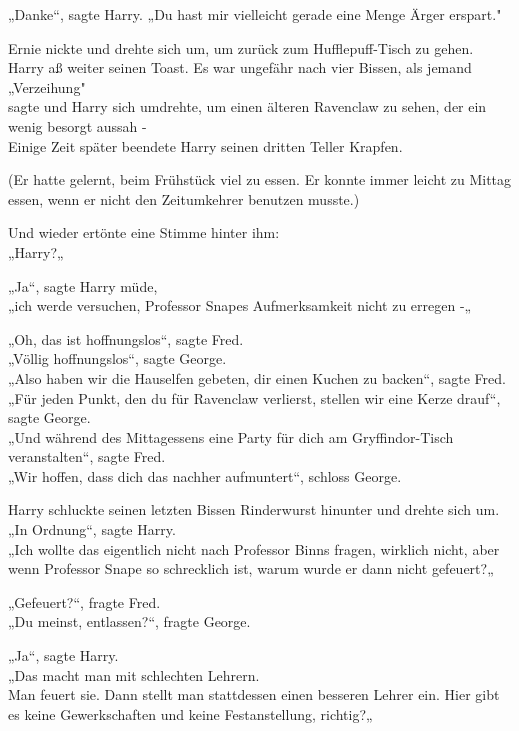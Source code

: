 {„Danke“, sagte Harry. „Du hast mir vielleicht gerade eine Menge Ärger erspart."

Ernie nickte und drehte sich um, um zurück zum Hufflepuff-Tisch zu gehen.\\ Harry aß weiter seinen Toast. Es war ungefähr nach vier Bissen, als jemand\\ „Verzeihung"\\ sagte und Harry sich umdrehte, um einen älteren Ravenclaw zu sehen, der ein wenig besorgt aussah -\\ Einige Zeit später beendete Harry seinen dritten Teller Krapfen.

(Er hatte gelernt, beim Frühstück viel zu essen. Er konnte immer leicht zu Mittag essen, wenn er nicht den Zeitumkehrer benutzen musste.)

Und wieder ertönte eine Stimme hinter ihm:\\ „Harry?„

„Ja“, sagte Harry müde,\\ „ich werde versuchen, Professor Snapes Aufmerksamkeit nicht zu erregen -„

„Oh, das ist hoffnungslos“, sagte Fred.\\ „Völlig hoffnungslos“, sagte George.\\ „Also haben wir die Hauselfen gebeten, dir einen Kuchen zu backen“, sagte Fred.\\ „Für jeden Punkt, den du für Ravenclaw verlierst, stellen wir eine Kerze drauf“, sagte George.\\ „Und während des Mittagessens eine Party für dich am Gryffindor-Tisch veranstalten“, sagte Fred.\\ „Wir hoffen, dass dich das nachher aufmuntert“, schloss George.

Harry schluckte seinen letzten Bissen Rinderwurst hinunter und drehte sich um.\\ „In Ordnung“, sagte Harry.\\ „Ich wollte das eigentlich nicht nach Professor Binns fragen, wirklich nicht, aber wenn Professor Snape so schrecklich ist, warum wurde er dann nicht gefeuert?„

„Gefeuert?“, fragte Fred.\\ „Du meinst, entlassen?“, fragte George.

„Ja“, sagte Harry.\\ „Das macht man mit schlechten Lehrern.\\ Man feuert sie. Dann stellt man stattdessen einen besseren Lehrer ein. Hier gibt es keine Gewerkschaften und keine Festanstellung, richtig?„

}
